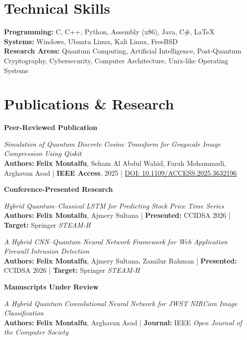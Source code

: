\documentclass[a4paper,10pt]{article}
\begin{document}

\section*{Technical Skills}

\textbf{Programming:} C, C++, Python, Assembly (x86), Java, C\#, LaTeX \\
\textbf{Systems:} Windows, Ubuntu Linux, Kali Linux, FreeBSD \\
\textbf{Research Areas:} Quantum Computing, Artificial Intelligence,
Post-Quantum Cryptography, Cybersecurity, Computer Architecture,
Unix-like Operating Systems


\section*{Publications \& Research}

\textbf{Peer-Reviewed Publication}

\textit{Simulation of Quantum Discrete Cosine Transform for Grayscale Image Compression Using Qiskit} \\
\textbf{Authors:} \textbf{Felix Montalfu}, Seham Al Abdul Wahid,
Farah Mohammadi, Arghavan Asad \;|\;
\textbf{IEEE Access}, 2025 \;|\;
\href{https://doi.org/10.1109/ACCESS.2025.3632196}{DOI: 10.1109/ACCESS.2025.3632196}

\textbf{Conference-Presented Research}

\textit{Hybrid Quantum--Classical LSTM for Predicting Stock Price Time Series} \\
\textbf{Authors:} \textbf{Felix Montalfu}, Ajmery Sultana \;|\;
\textbf{Presented:} CCIDSA 2026 \;|\;
\textbf{Target:} Springer \textit{STEAM-H}

\textit{A Hybrid CNN--Quantum Neural Network Framework for Web Application Firewall Intrusion Detection} \\
\textbf{Authors:} \textbf{Felix Montalfu}, Ajmery Sultana, Zamilur Rahman \;|\;
\textbf{Presented:} CCIDSA 2026 \;|\;
\textbf{Target:} Springer \textit{STEAM-H}

\textbf{Manuscripts Under Review}

\textit{A Hybrid Quantum Convolutional Neural Network for JWST NIRCam Image Classification} \\
\textbf{Authors:} \textbf{Felix Montalfu}, Arghavan Asad \;|\;
\textbf{Journal:} IEEE \textit{Open Journal of the Computer Society}
\end{document}
